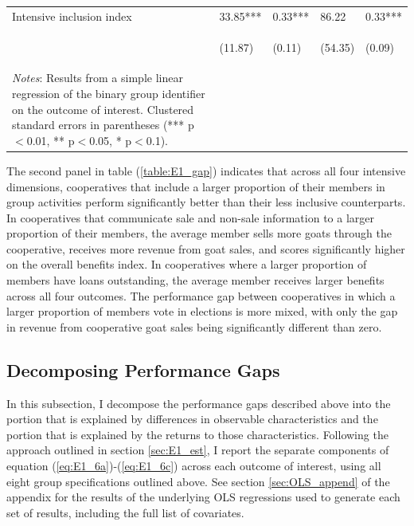 \documentclass[11pt]{article}
\begin{document}
\begin{table}[H]
{\begin{tabularx}{1.5\linewidth}{lllll}
\noalign{\smallskip}Intensive inclusion index & 33.85*** & 0.33*** & 86.22 & 0.33***\\
 & \begin{footnotesize}(11.87)\end{footnotesize} & \begin{footnotesize}(0.11)\end{footnotesize} & \begin{footnotesize}(54.35)\end{footnotesize} & \begin{footnotesize}(0.09)\end{footnotesize}\\
\noalign{\smallskip}\hline
\multicolumn{5}{@{}p{1.5\linewidth}}
{\textit{Notes}: Results from a simple linear regression of the binary group identifier on the outcome of interest. Clustered standard errors in parentheses (*** p$<$0.01, ** p$<$0.05, * p$<$0.1). }
  \end{tabularx}}
\end{table}
\doublespacing

The second panel in table (\ref{table:E1_gap}) indicates that across all four intensive dimensions, cooperatives that include a larger proportion of their members in group activities perform significantly better than their less inclusive counterparts. In cooperatives that communicate sale and non-sale information to a larger proportion of their members, the average member sells more goats through the cooperative, receives more revenue from goat sales, and scores significantly higher on the overall benefits index. In cooperatives where a larger proportion of members have loans outstanding, the average member receives larger benefits across all four outcomes. The performance gap between cooperatives in which a larger proportion of members vote in elections is more mixed, with only the gap in revenue from cooperative goat sales being significantly different than zero. 


\subsection{Decomposing Performance Gaps}

In this subsection, I decompose the performance gaps described above into the portion that is explained by differences in observable characteristics and the portion that is explained by the returns to those characteristics. Following the approach outlined in section \ref{sec:E1_est}, I report the separate components of equation (\ref{eq:E1_6a})-(\ref{eq:E1_6c}) across each outcome of interest, using all eight group specifications outlined above. See section \ref{sec:OLS_append} of the appendix for the results of the underlying OLS regressions used to generate each set of results, including the full list of covariates.
\end{document}
